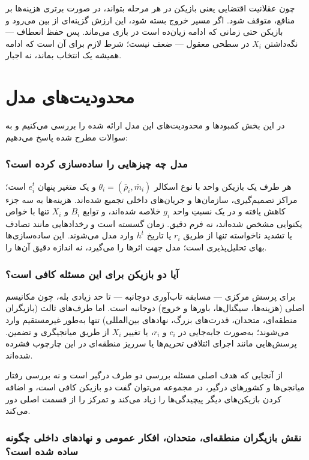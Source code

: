 \documentclass[12pt]{article}
\begin{document}
چون عقلانیت اقتضایی یعنی بازیکن در هر مرحله بتواند،
در صورت برتری هزینه‌ها بر منافع، متوقف شود.
اگر مسیر خروج بسته شود، این ارزش گزینه‌ای از بین می‌رود
و بازیکن حتی زمانی که ادامه زیان‌ده است در بازی می‌ماند.
پس حفظ انعطاف — نگه‌داشتن $X_i$ در سطحی معقول — ضعف نیست؛
شرط لازم برای آن است که ادامه همیشه یک انتخاب بماند، نه اجبار.


\section{محدودیت‌های مدل}

در این بخش کمبودها و محدودیت‌های این مدل ارائه شده را بررسی می‌کنیم
و به سوالات مطرح شده پاسخ می‌دهیم:

\subsubsection*{مدل چه چیزهایی را ساده‌سازی کرده است؟}

هر طرف یک بازیکن واحد با نوع اسکالر $\theta_i = (\bar{\rho}_i,\bar{m}_i)$
و یک متغیر پنهان $e_i^t$ است؛ مراکز تصمیم‌گیری، سازمان‌ها و جریان‌های داخلی تجمیع شده‌اند.
هزینه‌ها به سه جزء کاهش یافته و در یک نسبتِ واحد $g_i$ خلاصه شده‌اند،
و توابع $B_i$ و $X_i$ تنها با خواص یکنوایی مشخص شده‌اند، نه فرم دقیق.
زمان گسسته است و رخدادهایی مانند تصادف یا تشدید ناخواسته
تنها از طریق $r_i$ یا تاریخ $h^t$ وارد مدل می‌شوند.
این ساده‌سازی‌ها بهای تحلیل‌پذیری است؛ مدل جهت اثرها را می‌گیرد، نه اندازه دقیق آن‌ها را.

\subsubsection*{آیا دو بازیکن برای این مسئله کافی است؟}

برای پرسش مرکزی — مسابقه تاب‌آوری دوجانبه — تا حد زیادی بله،
چون مکانیسم اصلی (هزینه‌ها، سیگنال‌ها، باورها و خروج) دوجانبه است.
اما طرف‌های ثالث (بازیگران منطقه‌ای، متحدان، قدرت‌های بزرگ، نهادهای بین‌المللی)
تنها به‌طور غیرمستقیم وارد می‌شوند؛ به‌صورت جابه‌جایی در 
$c_i$ و $r_i$،
یا تغییر $X_i$ از طریق میانجیگری و تضمین.
پرسش‌هایی مانند اجرای ائتلافی تحریم‌ها یا سرریز منطقه‌ای
در این چارچوب فشرده شده‌اند. 

از آنجایی که هدف اصلی مسئله بررسی دو طرف درگیر است و نه 
بررسی رفتار میانجی‌ها و کشورهای درگیر، در مجموعه می‌توان گفت دو بازیکن کافی است،
و اضافه کردن بازیکن‌های دیگر پیچیدگی‌ها را زیاد می‌کند و تمرکز را از قسمت اصلی
دور می‌کند.

\subsubsection*{نقش بازیگران منطقه‌ای، متحدان، افکار عمومی و نهادهای داخلی چگونه ساده شده است؟}
\end{document}
